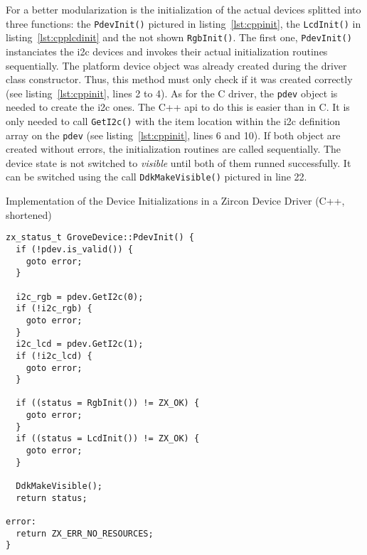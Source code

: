 For a better modularization is the initialization of the actual devices splitted into three functions: the \texttt{PdevInit()} pictured in listing~\ref{lst:cppinit}, the \texttt{LcdInit()} in listing~\ref{lst:cpplcdinit} and the not shown \texttt{RgbInit()}.
The first one, \texttt{PdevInit()} instanciates the \ac{i2c} devices and invokes their actual initialization routines sequentially.
The platform device object was already created during the driver class constructor.
Thus, this method must only check if it was created correctly (see listing~\ref{lst:cppinit}, lines 2 to 4).
As for the C driver, the \texttt{pdev} object is needed to create the \ac{i2c} ones.
The C++ \ac{api} to do this is easier than in C.
It is only needed to call \texttt{GetI2c()} with the item location within the \ac{i2c} definition array on the \texttt{pdev} (see listing~\ref{lst:cppinit}, lines 6 and 10).
If both object are created without errors, the initialization routines are called sequentially.
The device state is not switched to \textit{visible} until both of them runned successfully.
It can be switched using the call \texttt{DdkMakeVisible()} pictured in line 22.

\begin{listing} [H]
    \caption{Implementation of the Device Initializations in a Zircon Device Driver (C++, shortened)}
\label{lst:cppinit}
\begin{verbatim}
zx_status_t GroveDevice::PdevInit() {
  if (!pdev.is_valid()) {
    goto error;
  }

  i2c_rgb = pdev.GetI2c(0);
  if (!i2c_rgb) {
    goto error;
  }
  i2c_lcd = pdev.GetI2c(1);
  if (!i2c_lcd) {
    goto error;
  }

  if ((status = RgbInit()) != ZX_OK) {
    goto error;
  }
  if ((status = LcdInit()) != ZX_OK) {
    goto error;
  }

  DdkMakeVisible();
  return status;

error:
  return ZX_ERR_NO_RESOURCES;
}
\end{verbatim}
\end{listing}

